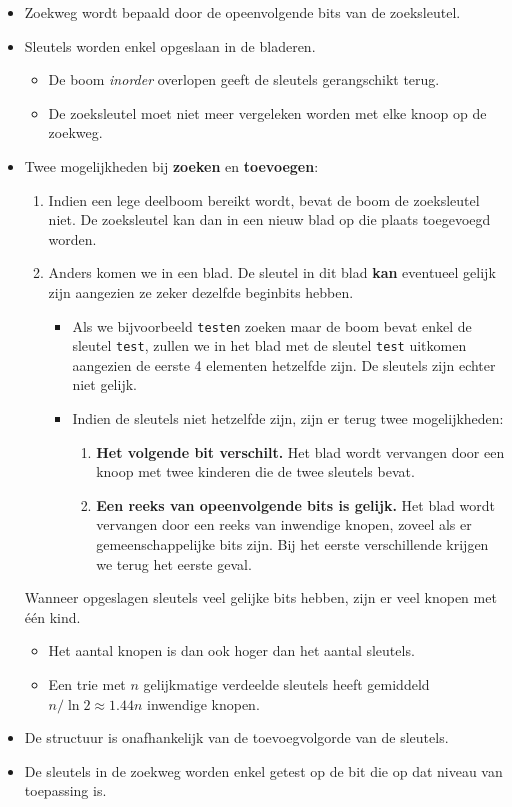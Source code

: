 \begin{itemize}
    \item Zoekweg wordt bepaald door de opeenvolgende bits van de zoeksleutel.
    \item Sleutels worden enkel opgeslaan in de bladeren.
    \begin{itemize}
        \item  De boom \textit{inorder} overlopen geeft de sleutels gerangschikt terug.
        \item  De zoeksleutel moet niet meer vergeleken worden met elke knoop op de zoekweg. 
    \end{itemize}
    \item Twee mogelijkheden bij \textbf{zoeken} en \textbf{toevoegen}:
    \begin{enumerate}
        \item Indien een lege deelboom bereikt wordt, bevat de boom de zoeksleutel niet. De zoeksleutel kan dan in een nieuw blad op die plaats toegevoegd worden.
        \item Anders komen we in een blad. De sleutel in dit blad \textbf{kan} eventueel gelijk zijn aangezien ze zeker dezelfde beginbits hebben.  

        \begin{itemize}
            \item Als we bijvoorbeeld \texttt{testen} zoeken maar de boom bevat enkel de sleutel \texttt{test}, zullen we in het blad met de sleutel \texttt{test} uitkomen aangezien de eerste 4 elementen hetzelfde zijn. De sleutels zijn echter niet gelijk.
            \item Indien de sleutels niet hetzelfde zijn, zijn er terug twee mogelijkheden:
            \begin{enumerate}
                \item \textbf{Het volgende bit verschilt.} Het blad wordt vervangen door een knoop met twee kinderen die de twee sleutels bevat.
                \item \textbf{Een reeks van opeenvolgende bits is gelijk.} Het blad wordt vervangen door een reeks van inwendige knopen, zoveel als er gemeenschappelijke bits zijn. Bij het eerste verschillende krijgen we terug het eerste geval.
            \end{enumerate}
        \end{itemize}
    \end{enumerate}
    \alert Wanneer opgeslagen sleutels veel gelijke bits hebben, zijn er veel knopen met één kind.
    \begin{itemize}
        \item Het aantal knopen is dan ook hoger dan het aantal sleutels.
        \item Een trie met $n$ gelijkmatige verdeelde sleutels heeft gemiddeld $n/\ln 2 \approx 1.44n$ inwendige knopen.
    \end{itemize}
    \item De structuur is onafhankelijk van de toevoegvolgorde van de sleutels.
    \item De sleutels in de zoekweg worden enkel getest op de bit die op dat niveau van toepassing is.
\end{itemize}


